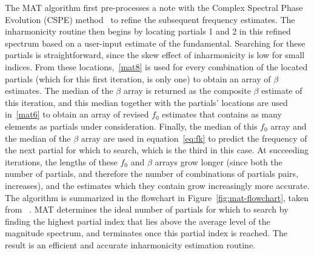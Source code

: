\documentclass[12pt]{cmuthesis}
\begin{document}
The MAT algorithm first pre-processes a note with the Complex Spectral Phase Evolution (CSPE) method~\cite{short2006} to refine the subsequent frequency estimates. The inharmonicity routine then begins by locating partials 1 and 2 in this refined spectrum based on a user-input estimate of the fundamental. Searching for these partials is straightforward, since the skew effect of inharmonicity is low for small indices. From these locations,~\eqref{mat8} is used for every combination of the located partials (which for this first iteration, is only one) to obtain an array of $\beta$ estimates. The median of the $\beta$ array is returned as the composite $\beta$ estimate of this iteration, and this median together with the partials' locations are used in~\eqref{mat6} to obtain an array of revised $f_0$ estimates that contains as many elements as partials under consideration. Finally, the median of this $f_0$ array and the median of the $\beta$ array are used in equation~\eqref{eq:fk} to predict the frequency of the next partial for which to search, which is the third in this case. At succeeding iterations, the lengths of these $f_0$ and $\beta$ arrays grow longer (since both the number of partials, and therefore the number of combinations of partials pairs, increases), and the estimates which they contain grow increasingly more accurate. The algorithm is summarized in the flowchart in Figure~\ref{fig:mat-flowchart}, taken from ~\cite{hodgkinson2009}. MAT determines the ideal number of partials for which to search by finding the highest partial index that lies above the average level of the magnitude spectrum, and terminates once this partial index is reached. The result is an efficient and accurate inharmonicity estimation routine. 
\end{document}
